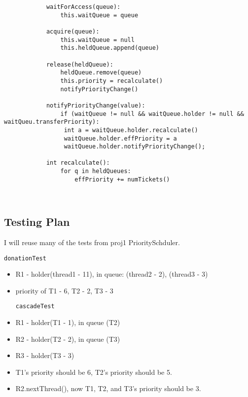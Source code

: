 \documentclass{article}
\begin{document}
\begin{verbatim}
            waitForAccess(queue):
                this.waitQueue = queue
            
            acquire(queue):                                     
                this.waitQueue = null
                this.heldQueue.append(queue)
            
            release(heldQueue):                      
                heldQueue.remove(queue)
                this.priority = recalculate()
                notifyPriorityChange()
                
            notifyPriorityChange(value):
                if (waitQueue != null && waitQueue.holder != null && waitQueu.transferPriority):
            	 int a = waitQueue.holder.recalculate()
            	 waitQueue.holder.effPriority = a
            	 waitQueue.holder.notifyPriorityChange();
            
            int recalculate():
                for q in heldQueues:
                    effPriority += numTickets()
             
            
\end{verbatim}
\subsection{Testing Plan}
I will reuse many of the tests from proj1 PrioritySchduler.

\texttt{donationTest}
\begin{itemize}
\item R1 - holder(thread1 - 11), in queue: (thread2 - 2), (thread3 - 3)
\item priority of T1 - 6, T2 - 2, T3 - 3

\texttt{cascadeTest}
\item R1 - holder(T1 - 1), in queue (T2)
\item R2 - holder(T2 - 2), in queue (T3)
\item R3 - holder(T3 - 3)
\item T1's priority should be 6, T2's priority should be 5.
\item R2.nextThread(), now T1, T2, and T3's priority should be 3.
\end{itemize}
\end{document}
